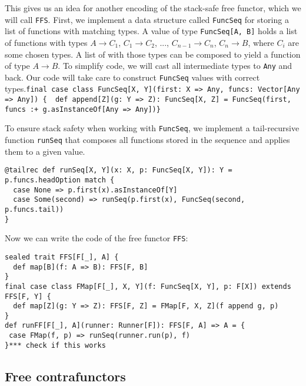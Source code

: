 This gives us an idea for another encoding of the stack-safe free
functor, which we will call \lstinline!FFS!.
First, we implement a data structure called \lstinline!FuncSeq!
for storing a list of functions with matching types. A value of type
\lstinline!FuncSeq[A, B]!
holds a list of functions with types $A\rightarrow C_{1}$, $C_{1}\rightarrow C_{2}$,
..., $C_{n-1}\rightarrow C_{n}$, $C_{n}\rightarrow B$, where $C_{i}$
are some chosen types. A list of with those types can be composed
to yield a function of type $A\rightarrow B$. To simplify code, we
will cast all intermediate types to \lstinline!Any!
and back. Our code will take care to construct \lstinline!FuncSeq!
values with correct types.\lstinline!final case class FuncSeq[X, Y](first: X => Any, funcs: Vector[Any => Any]) {  def append[Z](g: Y => Z): FuncSeq[X, Z] = FuncSeq(first, funcs :+ g.asInstanceOf[Any => Any])}!

To ensure stack safety when working with \lstinline!FuncSeq!,
we implement a tail-recursive function \lstinline!runSeq!
that composes all functions stored in the sequence and applies them
to a given value.

\begin{lstlisting}
@tailrec def runSeq[X, Y](x: X, p: FuncSeq[X, Y]): Y = p.funcs.headOption match {
  case None => p.first(x).asInstanceOf[Y]
  case Some(second) => runSeq(p.first(x), FuncSeq(second, p.funcs.tail))
}
\end{lstlisting}
Now we can write the code of the free functor \lstinline!FFS!:
\begin{lstlisting}
sealed trait FFS[F[_], A] {
  def map[B](f: A => B): FFS[F, B]
}
final case class FMap[F[_], X, Y](f: FuncSeq[X, Y], p: F[X]) extends FFS[F, Y] {
  def map[Z](g: Y => Z): FFS[F, Z] = FMap[F, X, Z](f append g, p)
}
def runFF[F[_], A](runner: Runner[F]): FFS[F, A] => A = {
 case FMap(f, p) => runSeq(runner.run(p), f)
}*** check if this works
\end{lstlisting}

\subsection{Free contrafunctors}

